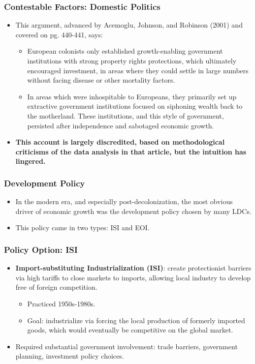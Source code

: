 \documentclass{beamer}
\begin{document}
\begin{frame} 
	\frametitle{\LARGE{Contestable Factors: Domestic Politics}}
	\begin{itemize}
		\item This argument, advanced by Acemoglu, Johnson, and Robinson (2001) and covered on pg. 440-441, says:
			\begin{itemize}
				\item European colonists only established growth-enabling government institutions with strong property rights protections, which ultimately encouraged investment, in areas where they could settle in large numbers without facing disease or other mortality factors. \pause
				\item In areas which were inhospitable to Europeans, they primarily set up extractive government institutions focused on siphoning wealth back to the motherland. These institutions, and this style of government, persisted after independence and sabotaged economic growth. \pause
			\end{itemize}
		\item \textbf{This account is largely discredited, based on methodological criticisms of the data analysis in that article, but the intuition has lingered.}
	\end{itemize}
\end{frame}

\begin{frame} 
	\frametitle{\LARGE{Development Policy}}
	\begin{itemize}
		\item In the modern era, and especially post-decolonization, the most obvious driver of economic growth was the development policy chosen by many LDCs. \pause
		\item This policy came in two types: ISI and EOI.
	\end{itemize}
\end{frame}


\begin{frame} 
	\frametitle{\LARGE{Policy Option: ISI}}
	\begin{itemize}
			\item \textbf{Import-substituting Industrialization (ISI)}: create protectionist barriers via high tariffs to close markets to imports, allowing local industry to develop free of foreign competition. \pause 
			\begin{itemize}
			    \item Practiced 1950s-1980s. \pause
			    \item Goal: industrialize via forcing the local production of formerly imported goods, which would eventually be competitive on the global market. \pause
			\end{itemize}
		\item Required substantial government involvement: trade barriers, government planning, investment policy choices.

	\end{itemize}
\end{frame}
\end{document}
